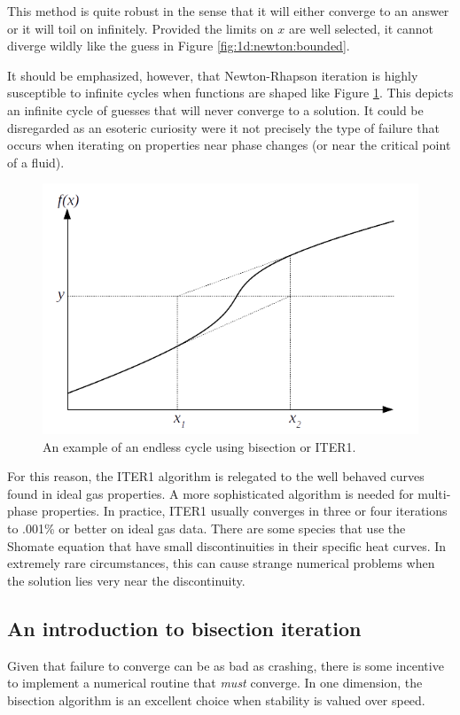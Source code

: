 \documentclass{article}
\begin{document}
This method is quite robust in the sense that it will either converge to an answer or it will toil on infinitely.  Provided the limits on $x$ are well selected, it cannot diverge wildly like the guess in Figure \ref{fig:1d:newton:bounded}.

It should be emphasized, however, that Newton-Rhapson iteration is highly susceptible to infinite cycles when functions are shaped like Figure \ref{fig:1d:newton:cycle}.  This depicts an infinite cycle of guesses that will never converge to a solution.  It could be disregarded as an esoteric curiosity were it not precisely the type of failure that occurs when iterating on properties near phase changes (or near the critical point of a fluid).

\begin{figure}
\centering
\includegraphics[width = 0.8\linewidth]{figures/1d_newton_cycle}
\caption{An example of an endless cycle using bisection or ITER1.}\label{fig:1d:newton:cycle}
\end{figure}

For this reason, the ITER1 algorithm is relegated to the well behaved curves found in ideal gas properties.  A more sophisticated algorithm is needed for multi-phase properties.  In practice, ITER1 usually converges in three or four iterations to .001\% or better on ideal gas data.  There are some species that use the Shomate equation that have small discontinuities in their specific heat curves.  In extremely rare circumstances, this can cause strange numerical problems when the solution lies very near the discontinuity.

\subsection{An introduction to bisection iteration}

Given that failure to converge can be as bad as crashing, there is some incentive to implement a numerical routine that \emph{must} converge.  In one dimension, the bisection algorithm is an excellent choice when stability is valued over speed.
\end{document}
